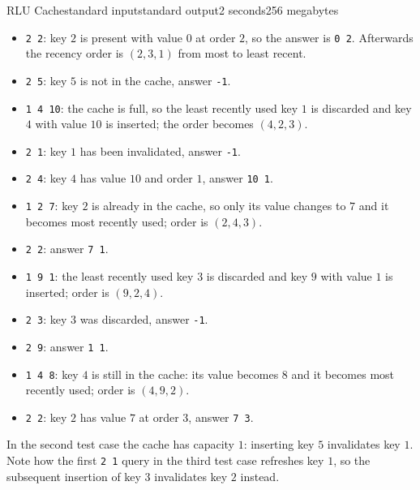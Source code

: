 \begin{problem}{RLU Cache}{standard input}{standard output}{2 seconds}{256 megabytes}
\begin{itemize}
  \item \texttt{2 2}: key $2$ is present with value $0$ at order $2$, so the answer is \texttt{0 2}. Afterwards the recency order is $(2, 3, 1)$ from most to least recent.
  \item \texttt{2 5}: key $5$ is not in the cache, answer \texttt{-1}.
  \item \texttt{1 4 10}: the cache is full, so the least recently used key $1$ is discarded and key $4$ with value $10$ is inserted; the order becomes $(4, 2, 3)$.
  \item \texttt{2 1}: key $1$ has been invalidated, answer \texttt{-1}.
  \item \texttt{2 4}: key $4$ has value $10$ and order $1$, answer \texttt{10 1}.
  \item \texttt{1 2 7}: key $2$ is already in the cache, so only its value changes to $7$ and it becomes most recently used; order is $(2, 4, 3)$.
  \item \texttt{2 2}: answer \texttt{7 1}.
  \item \texttt{1 9 1}: the least recently used key $3$ is discarded and key $9$ with value $1$ is inserted; order is $(9, 2, 4)$.
  \item \texttt{2 3}: key $3$ was discarded, answer \texttt{-1}.
  \item \texttt{2 9}: answer \texttt{1 1}.
  \item \texttt{1 4 8}: key $4$ is still in the cache: its value becomes $8$ and it becomes most recently used; order is $(4, 9, 2)$.
  \item \texttt{2 2}: key $2$ has value $7$ at order $3$, answer \texttt{7 3}.
\end{itemize}

In the second test case the cache has capacity $1$: inserting key $5$ invalidates key $1$. Note how the first \texttt{2 1} query in the third test case refreshes key $1$, so the subsequent insertion of key $3$ invalidates key $2$ instead.


\end{problem}

